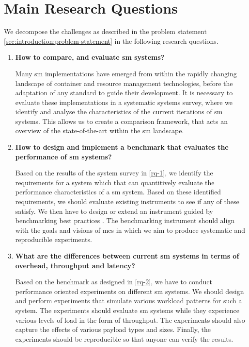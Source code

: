 \section{Main Research Questions}
\label{sec:introduction:research-questions}

We decompose the challenges as described in the problem statement \cref{sec:introduction:problem-statement} in the following research questions.


\begin{enumerate}[label=\textbf{RQ\arabic*}, leftmargin=3\parindent]
    \item \textbf{How to compare, and evaluate \gls{sm} systems?}
    \label{rq-1}
    
    Many \gls{sm} implementations have emerged from within the rapidly changing landscape of container and resource management technologies, before the adaptation of any standard to guide their development. It is necessary to evaluate these implementations in a systematic systems survey, where we identify and analyse the characteristics of the current iterations of \gls{sm} systems. This allows us to create a comparison framework, that acts an overview of the state-of-the-art within the \gls{sm} landscape.
    
    \item \textbf{How to design and implement a benchmark that evaluates the performance of \gls{sm} systems?}
    \label{rq-2}
    
    Based on the results of the system survey in \ref{rq-1}, we identify the requirements for a system which that can quantitively evaluate the performance characteristics of a \gls{sm} system. Based on these identified requirements, we should evaluate existing instruments to see if any of these satisfy. We then have to design or extend an instrument guided by benchmarking best practices \cite{folkerts2012benchmarking}. The benchmarking instrument should align with the goals and visions of \gls{mcs} in which we aim to produce systematic and reproducible experiments.
    
    \item \textbf{What are the differences between current \gls{sm} systems in terms of overhead, throughput and latency?}
    \label{rq-3}
    
    Based on the benchmark as designed in \ref{rq-2}, we have to conduct performance oriented experiments on different \gls{sm} systems. We should design and perform experiments that simulate various workload patterns for such a system. The experiments should evaluate \gls{sm} systems while they experience various levels of load in the form of throughput. The experiments should also capture the effects of various payload types and sizes. Finally, the experiments should be reproducible so that anyone can verify the results.
\end{enumerate}

